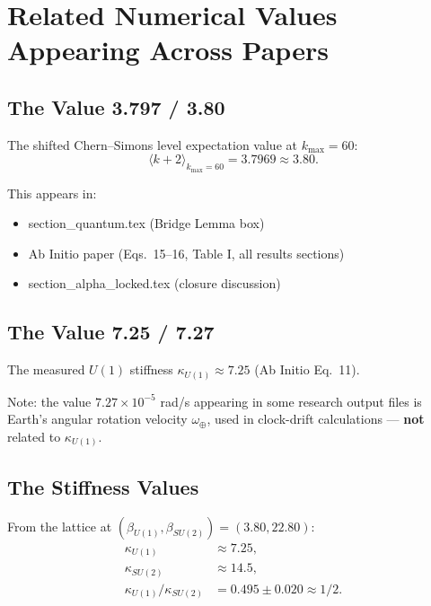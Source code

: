 \documentclass[11pt]{article}
\begin{document}
\section{Related Numerical Values Appearing Across Papers}

\subsection{The Value 3.797 / 3.80}

The shifted Chern--Simons level expectation value at $k_{\max} = 60$:
\begin{equation}\tag{NUM-1}
\langle k + 2 \rangle_{k_{\max}=60} = 3.7969 \approx 3.80.
\end{equation}

This appears in:
\begin{itemize}
\item section\_quantum.tex (Bridge Lemma box)
\item Ab Initio paper (Eqs.~15--16, Table I, all results sections)
\item section\_alpha\_locked.tex (closure discussion)
\end{itemize}

\subsection{The Value 7.25 / 7.27}

The measured $U(1)$ stiffness $\kappa_{U(1)} \approx 7.25$ (Ab Initio Eq.~11).

Note: the value $7.27 \times 10^{-5}$ rad/s appearing in some research output files
is Earth's angular rotation velocity $\omega_\oplus$, used in clock-drift calculations ---
\textbf{not} related to $\kappa_{U(1)}$.

\subsection{The Stiffness Values}

From the lattice at $(\beta_{U(1)}, \beta_{SU(2)}) = (3.80, 22.80)$:
\begin{align}
\kappa_{U(1)} &\approx 7.25, \tag{STIFF-1} \\
\kappa_{SU(2)} &\approx 14.5, \tag{STIFF-2} \\
\kappa_{U(1)}/\kappa_{SU(2)} &= 0.495 \pm 0.020 \approx 1/2. \tag{STIFF-3}
\end{align}
\end{document}
